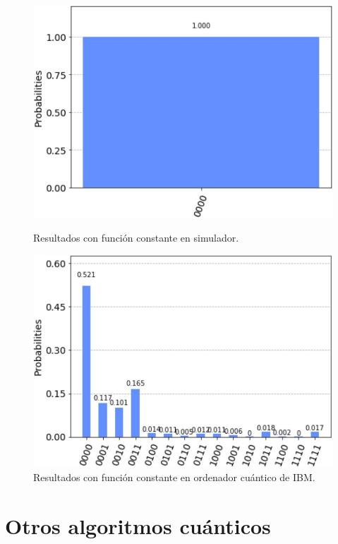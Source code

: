 \begin{figure}[htb!]
    \centering
    \begin{minipage}{0.45\textwidth}
        \centering
        \includegraphics[width=1\textwidth]{images/simulator_constant}
        \caption{Resultados con función constante en simulador.}
        \label{fig:fig66}
    \end{minipage}\hfill
    \begin{minipage}{0.45\textwidth}
        \centering
        \includegraphics[width=1\textwidth]{images/ibmq_constant}
        \caption{Resultados con función constante en ordenador cuántico de IBM.}
        \label{fig:fig67}
    \end{minipage}
\end{figure}

\section{Otros algoritmos cuánticos}
\label{sec:sec62}

